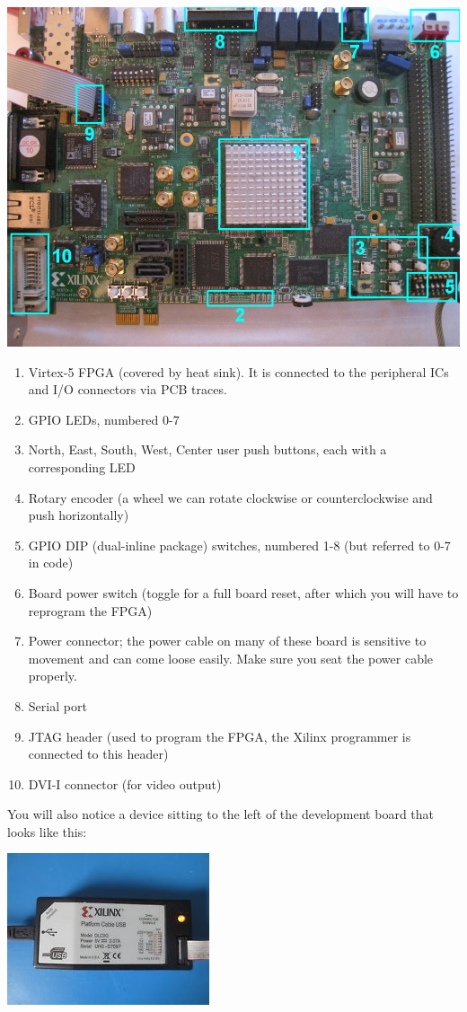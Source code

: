 \documentclass[11pt]{article}
\begin{document}
\includegraphics[width=\textwidth]{images/dev_board.png}
\begin{enumerate}
	\item Virtex-5 FPGA (covered by heat sink). It is connected to the peripheral ICs and I/O connectors via PCB traces.
	\item GPIO LEDs, numbered 0-7
	\item North, East, South, West, Center user push buttons, each with a corresponding LED
	\item Rotary encoder (a wheel we can rotate clockwise or counterclockwise and push horizontally)
	\item GPIO DIP (dual-inline package) switches, numbered 1-8 (but referred to 0-7 in code)
	\item Board power switch (toggle for a full board reset, after which you will have to reprogram the FPGA)
	\item Power connector; the power cable on many of these board is sensitive to movement and can come loose easily. Make sure you seat the power cable properly.
	\item Serial port
	\item JTAG header (used to program the FPGA, the Xilinx programmer is connected to this header)
	\item DVI-I connector (for video output)
\end{enumerate}

You will also notice a device sitting to the left of the development board that looks like this:\\

\begin{center}
	\includegraphics{images/xilinx_platform_cable.jpg}
\end{center}
\end{document}
